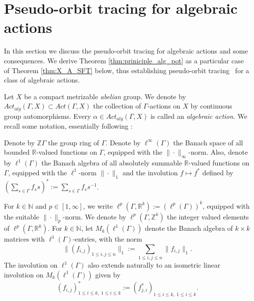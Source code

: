 \documentclass[oneside,english]{amsart}
\theoremstyle{definition}
\newcommand{\ZZ}{\mathbb{Z}}
\newcommand{\Act}[2]{\mathit{Act}({#1},{#2})}
\newcommand{\Alg}[2]{\mathit{Act}_{\mathit{alg}}({#1},{#2})}
\newcommand{\POT}{pseudo-orbit tracing}
\begin{document}
\section{Pseudo-orbit tracing  for  algebraic actions}\label{sec:pot_alg}
In this section we discuss the pseudo-orbit tracing for algebraic actions and some consequences.
We derive Theorem \ref{thm:priniciple_alg_pot}  as a particular case of  Theorem \ref{thm:X_A_SFT} below, thus establishing \POT~ for a class of algebraic actions.

Let $X$ be a  compact metrizable  \emph{abelian} group.
We  denote by $\Alg{\Gamma}{X} \subset \Act{\Gamma}{X}$  the collection of  $\Gamma$-actions on $X$  by continuous group automorphisms.
Every  $\alpha \in \Alg{\Gamma}{X}$ is  called an \emph{algebraic action}.
We recall some notation, essentially following \cite{MR3314515}:

Denote by $\mathbb{Z}\Gamma$  the group ring of $\Gamma$. Denote by $\ell^\infty(\Gamma)$ the Banach space of all bounded $\mathbb{R}$-valued functions
on $\Gamma$, equipped with the $\|\cdot\|_\infty$-norm. Also,  denote  by $\ell^1(\Gamma)$  the Banach
algebra of all absolutely summable $\mathbb{R}$-valued functions on $\Gamma$, equipped with the
$\ell^1$-norm $\|\cdot\|_1$ and the involution $f \mapsto f^*$ defined by $\left(\sum_{s \in \Gamma}f_ss \right)^* := \sum_{s \in \Gamma}f_s s^{-1}$.

For $k \in \mathbb{N}$ and $p \in[1,\infty]$, we write $\ell^p(\Gamma,\mathbb{R}^k):= (\ell^p(\Gamma))^k$, equipped with the suitable $\|\cdot\|_p$-norm.
We denote by $\ell^p(\Gamma,\ZZ^k)$ the integer valued elements of $\ell^p(\Gamma,\mathbb{R}^k)$.
For $k \in \mathbb{N}$, let $M_k(\ell^1(\Gamma))$ denote the Banach algebra of $k \times k$ matrices with $\ell^1(\Gamma)$-entries, with the norm
$$ \| (f_{i,j})_{ 1\le i,j \le n}\|_1 := \sum_{1\le i,j \le n} \| f_{i,j}\|_1.$$
The involution on $\ell^1(\Gamma)$ also extends naturally to an isometric linear involution on $M_k(\ell^1(\Gamma))$ given by
$$ (f_{i,j})^*_{1 \le i \le k,\; 1 \le i \le k} :=  (f_{j,i}^*)_{1 \le i \le k,\; 1 \le i \le k}.$$
\end{document}
